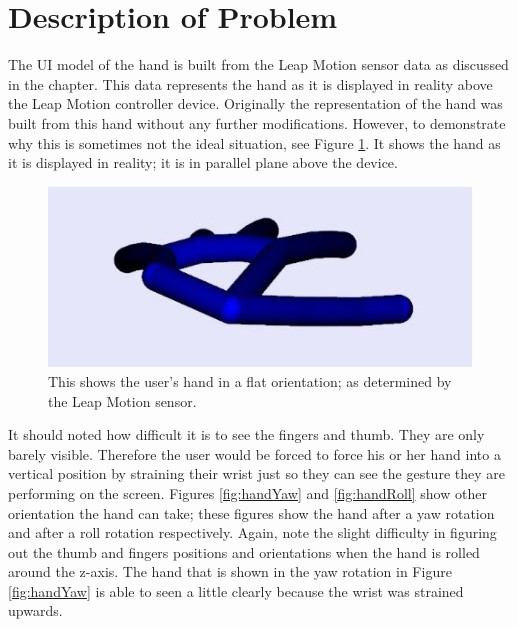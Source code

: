 \section{Description of Problem}
The UI model of the hand is built from the Leap Motion sensor data as discussed in the chapter. This data represents the hand as it is displayed in reality above the Leap Motion controller device. Originally the representation of the hand was built from this hand without any further modifications. However, to demonstrate why this is sometimes not the ideal situation, see Figure \ref{fig:handFlat}. It shows the hand as it is displayed in reality; it is in parallel plane above the device. 
\begin{figure}[H]
\centering
\includegraphics[scale=0.65]{Figures/4_handFlat.JPG}
\caption[Hand in Flat Orientation]{This shows the user's hand in a flat orientation; as determined by the Leap Motion sensor.}
\label{fig:handFlat}
\end{figure}
It should noted how difficult it is to see the fingers and thumb. They are only barely visible. Therefore the user would be forced to force his or her hand into a vertical position by straining their wrist just so they can see the gesture they are performing on the screen. Figures \ref{fig:handYaw} and \ref{fig:handRoll} show other orientation the hand can take; these figures show the hand after a yaw rotation and after a roll rotation respectively. Again, note the slight difficulty in figuring out the thumb and fingers positions and orientations when the hand is rolled around the z-axis. The hand that is shown in the yaw rotation in Figure \ref{fig:handYaw} is able to seen a little clearly because the wrist was strained upwards. 
